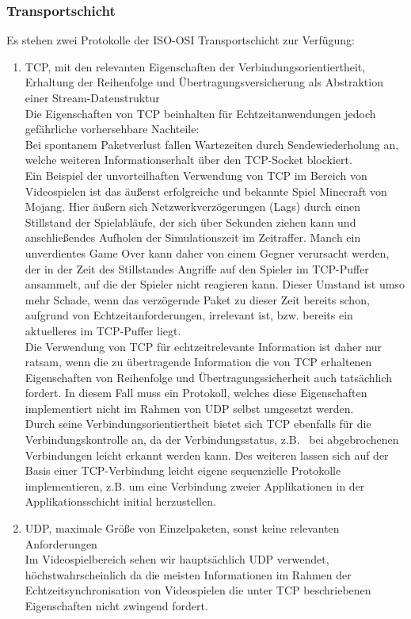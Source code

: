 \documentclass[11pt,twoside,a4paper]{article}
\begin{document}
\subsubsection{Transportschicht}
Es stehen zwei Protokolle der ISO-OSI Transportschicht zur Verfügung:
\begin{enumerate}
\item TCP, mit den relevanten Eigenschaften der Verbindungsorientiertheit, Erhaltung der Reihenfolge und Übertragungsversicherung als Abstraktion einer Stream-Datenstruktur\\
	Die Eigenschaften von TCP beinhalten für Echtzeitanwendungen jedoch gefährliche vorhersehbare Nachteile:\\
	Bei spontanem Paketverlust fallen Wartezeiten durch Sendewiederholung an, welche weiteren Informationserhalt über den TCP-Socket blockiert.\\
Ein Beispiel der unvorteilhaften Verwendung von TCP im Bereich von Videospielen ist das äußerst erfolgreiche und bekannte Spiel Minecraft von Mojang. Hier äußern sich Netzwerkverzögerungen (Lags) durch einen Stillstand der Spielabläufe, der sich über Sekunden ziehen kann und anschließendes Aufholen der Simulationszeit im Zeitraffer. Manch ein unverdientes Game Over kann daher von einem Gegner verursacht werden, der in der Zeit des Stillstandes Angriffe auf den Spieler im TCP-Puffer ansammelt, auf die der Spieler nicht reagieren kann. Dieser Umstand ist umso mehr Schade, wenn das verzögernde Paket zu dieser Zeit bereits schon, aufgrund von Echtzeitanforderungen, irrelevant ist, bzw. bereits ein aktuelleres im TCP-Puffer liegt.\\
Die Verwendung von TCP für echtzeitrelevante Information ist daher nur ratsam, wenn die zu übertragende Information die von TCP erhaltenen Eigenschaften von Reihenfolge und Übertragungssicherheit auch tatsächlich fordert. In diesem Fall muss ein Protokoll, welches diese Eigenschaften implementiert nicht im Rahmen von UDP selbst umgesetzt werden.\\
Durch seine Verbindungsorientiertheit bietet sich TCP ebenfalls für die Verbindungskontrolle an, da der Verbindungsstatus, z.B.~ bei abgebrochenen Verbindungen leicht erkannt werden kann. Des weiteren lassen sich auf der Basis einer TCP-Verbindung leicht eigene sequenzielle Protokolle implementieren, z.B. um eine Verbindung zweier Applikationen in der Applikationsschicht initial herzustellen.
\item UDP, maximale Größe von Einzelpaketen, sonst keine relevanten Anforderungen\\
	Im Videospielbereich sehen wir hauptsächlich UDP verwendet, höchstwahrscheinlich
	da die meisten Informationen im Rahmen der Echtzeitsynchronisation von Videospielen die unter TCP beschriebenen Eigenschaften nicht zwingend fordert.
\end{enumerate}
\end{document}

